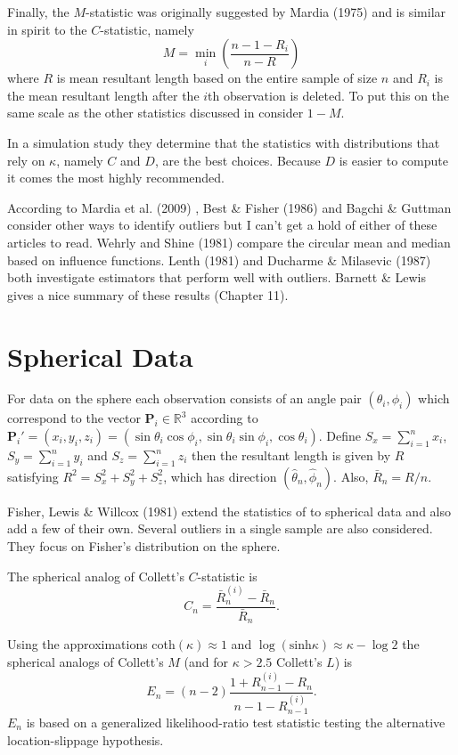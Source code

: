 \documentclass{article}\usepackage[]{graphicx}\usepackage[]{color}
\newcommand{\R}{{\mathbb{R}}}
\begin{document}
Finally, the $M$-statistic was originally suggested by Mardia (1975) \cite{mardia1975} and is similar in spirit to the $C$-statistic, namely
\[
M=\min_i\left(\frac{n-1-R_i}{n-R}\right)
\]
where $R$ is mean resultant length based on the entire sample of size $n$ and $R_i$ is the mean resultant length after the $i$th observation is deleted.  To put this on the same scale as the other statistics discussed in \cite{collett1980} consider $1-M$.

In a simulation study they determine that the statistics with distributions that rely on $\kappa$, namely $C$ and $D$, are the best choices.  Because $D$ is easier to compute it comes the most highly recommended.

According to Mardia et al. (2009) \cite{mardia2009},  Best \& Fisher (1986) \cite{best1986} and Bagchi \& Guttman \cite{bagchi1990} consider other ways to identify outliers but I can't get a hold of either of these articles to read.  Wehrly and Shine (1981) \cite{wehrly1981} compare the circular mean and median based on influence functions.  Lenth (1981) \cite{lenth1981} and Ducharme \& Milasevic (1987) \cite{ducharme1987} both investigate estimators that perform well with outliers.  Barnett \& Lewis \cite{barnett1994} gives a nice summary of these results (Chapter 11).


\section{Spherical Data}\label{sec:sphere}

For data on the sphere each observation consists of an angle pair $(\theta_i,\phi_i)$ which correspond to the vector $\bm P_i\in \R^3$ according to $\bm P_i'=(x_i,y_i,z_i)=(\sin\theta_i\cos\phi_i,\sin\theta_i\sin\phi_i,\cos\theta_i)$.  Define $S_x=\sum_{i=1}^nx_i$, $S_y=\sum_{i=1}^ny_i$ and $S_z=\sum_{i=1}^nz_i$ then the resultant length is given by $R$ satisfying $R^2=S_x^2+S_y^2+S_z^2$, which has direction $(\hat\theta_n,\hat\phi_n)$.  Also, $\bar{R}_n=R/n$.


Fisher, Lewis \& Willcox (1981) \cite{fisher1981} extend the statistics of \cite{collett1980} to spherical data and also add a few of their own.  Several outliers in a single sample are also considered.  They focus on Fisher's distribution on the sphere.

The spherical analog of Collett's $C$-statistic is
\[
C_n=\frac{\bar{R}_n^{(i)}-\bar{R}_n}{\bar{R}_n}.
\]

Using the approximations coth$(\kappa)\approx 1$ and $\log(\text{sinh}\kappa)\approx\kappa-\log 2$ the spherical analogs of Collett's $M$ (and for $\kappa>2.5$ Collett's $L$) is 
\[
E_n=(n-2)\frac{1+R_{n-1}^{(i)}-R_n}{n-1-R_{n-1}^{(i)}}.
\]
$E_n$ is based on a generalized likelihood-ratio test statistic testing the alternative location-slippage hypothesis.
\end{document}
